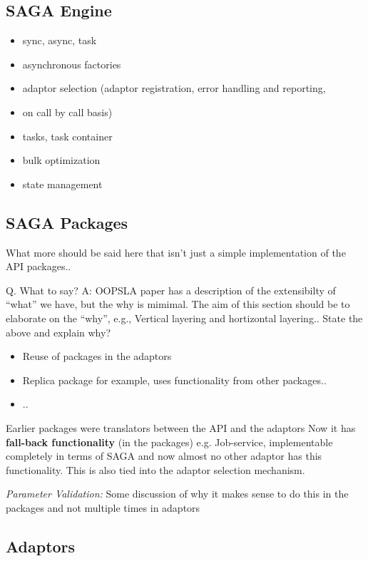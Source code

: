 \documentclass[10pt,letterpaper]{article}
\begin{document}
\subsection{SAGA Engine}

\begin{itemize}
	\item sync, async, task
	\item asynchronous factories
	\item adaptor selection (adaptor registration, error handling and reporting,
	\item on call by call basis)
	\item tasks, task container
	\item bulk optimization
	\item state management
\end{itemize}

\subsection{SAGA Packages}

What more should be said here that isn't just a simple implementation
of the API packages.. 

Q. What to say?  A: OOPSLA paper has a description of the extensibilty
of ``what'' we have, but the why is mimimal. The aim of this section
should be to elaborate on the ``why'', e.g., Vertical layering and
hortizontal layering..  State the above and explain why?

\begin{itemize}
\item Reuse of packages in the adaptors
\item Replica package for example, uses functionality from other packages..
\item ..
\end{itemize}

Earlier packages were translators between the API and the adaptors Now
it has {\bf fall-back functionality} (in the packages)
e.g. Job-service, implementable completely in terms of SAGA and now
almost no other adaptor has this functionality.  This is also tied
into the adaptor selection mechanism.

{\it Parameter Validation:} Some discussion of why it makes
sense to do this in the packages and not multiple times in adaptors

\subsection{Adaptors}
\end{document}
